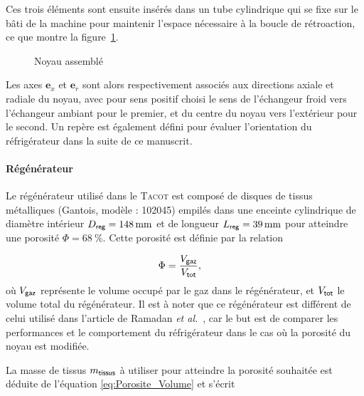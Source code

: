 Ces trois éléments sont ensuite insérés dans un tube cylindrique qui se fixe sur le bâti de la machine pour maintenir l'espace nécessaire à la boucle de rétroaction, ce que montre la figure~\ref{fig:TacotPhotosNoyau_Assemble}.

\begin{figure}[!ht]
    \centering
    \caption{Noyau assemblé}
    \label{fig:TacotPhotosNoyau_Assemble}
\end{figure}


Les axes $\mathbf e_x$ et $\mathbf e_r$ sont alors respectivement associés aux directions axiale et radiale du noyau,  avec pour sens positif choisi le sens de l'échangeur froid vers l'échangeur ambiant pour le premier, et du centre du noyau vers l'extérieur pour le second. Un repère est également défini pour évaluer l'orientation du réfrigérateur dans la suite de ce manuscrit.\medskip

\paragraph{Régénérateur} Le régénérateur utilisé dans le \textsc{Tacot} est composé de  disques de tissus métalliques (Gantois, modèle : 102045) empilés dans une enceinte cylindrique de diamètre intérieur $D_{\sf reg}=\qty{148}{\mm}$ et de longueur $L_{\sf reg}=\qty{39}{\mm}$ pour atteindre une porosité $\Phi=\qty{68}{\percent}$. Cette porosité est définie par la relation

\begin{align}
	\Phi &= \frac{V_{\sf gaz}}{V_{\sf tot}}, \label{eq:Porosite_Volume}%
\end{align}
où $V_{\sf gaz}$ représente le volume occupé par le gaz dans le régénérateur, et $V_{\sf tot}$ le volume total du régénérateur. Il est à noter que ce régénérateur est différent de celui utilisé dans l'article de Ramadan \textit{et al.}~\cite{ramadan_design_2021}, car le but est de comparer les performances et le comportement du réfrigérateur dans le cas où la porosité du noyau est modifiée. 

La masse de tissus $m_{\sf tissus}$ à utiliser pour atteindre la porosité souhaitée est déduite de l'équation \eqref{eq:Porosite_Volume} et s'écrit 

